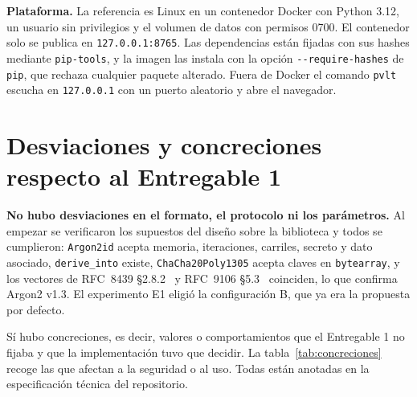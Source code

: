 \documentclass[11pt,letterpaper]{article}
\newcommand{\code}[1]{\texttt{#1}}
\newcommand{\pvlt}{\code{pvlt}}
\begin{document}
\textbf{Plataforma.} La referencia es Linux en un contenedor Docker con Python 3.12, un usuario sin privilegios y el volumen de datos con permisos 0700. El contenedor solo se publica en \code{127.0.0.1:8765}. Las dependencias están fijadas con sus hashes mediante \code{pip-tools}, y la imagen las instala con la opción \code{-{}-require-hashes} de \code{pip}, que rechaza cualquier paquete alterado. Fuera de Docker el comando \pvlt{} escucha en \code{127.0.0.1} con un puerto aleatorio y abre el navegador.

\section{Desviaciones y concreciones respecto al Entregable 1}\label{sec:desviaciones}

\textbf{No hubo desviaciones en el formato, el protocolo ni los parámetros.} Al empezar se verificaron los supuestos del diseño sobre la biblioteca y todos se cumplieron: \code{Argon2id} acepta memoria, iteraciones, carriles, secreto y dato asociado, \code{derive\_into} existe, \code{ChaCha20Poly1305} acepta claves en \code{bytearray}, y los vectores de RFC~8439 §2.8.2~\cite{rfc8439} y RFC~9106 §5.3~\cite{rfc9106} coinciden, lo que confirma Argon2 v1.3. El experimento E1 eligió la configuración B, que ya era la propuesta por defecto.

Sí hubo concreciones, es decir, valores o comportamientos que el Entregable 1 no fijaba y que la implementación tuvo que decidir. La tabla~\ref{tab:concreciones} recoge las que afectan a la seguridad o al uso. Todas están anotadas en la especificación técnica del repositorio.
\end{document}
